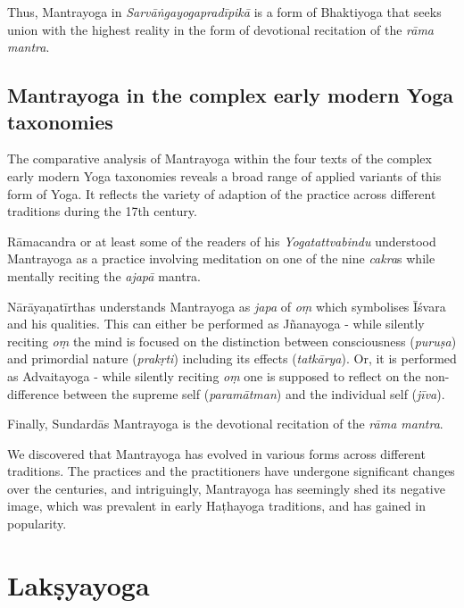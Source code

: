 Thus, Mantrayoga in \textit{Sarvāṅgayogapradīpikā} is a form of Bhaktiyoga that seeks union with the highest reality in the form of devotional recitation of the \textit{rāma mantra}. 

\subsection{Mantrayoga in the complex early modern Yoga taxonomies}

The comparative analysis of Mantrayoga within the four texts of the complex early modern Yoga taxonomies reveals a broad range of applied variants of this form of Yoga. It reflects the variety of adaption of the practice across different traditions during the 17th century.

Rāmacandra or at least some of the readers of his \emph{Yogatattvabindu} understood Mantrayoga as a practice involving meditation on one of the nine \textit{cakra}s while mentally reciting the \textit{ajapā} mantra.

Nārāyaṇatīrthas understands Mantrayoga as \textit{japa} of \textit{oṃ} which symbolises Īśvara and his qualities. This can either be performed as Jñanayoga - while silently reciting \textit{oṃ} the mind is focused on the distinction between consciousness (\textit{puruṣa}) and primordial nature (\textit{prakṛti}) including its effects (\textit{tatkārya}). Or, it is performed as Advaitayoga - while silently reciting \textit{oṃ} one is supposed to reflect on the non-difference between the supreme self (\textit{paramātman}) and the individual self (\textit{jīva}).

Finally, Sundardās Mantrayoga is the devotional recitation of the \textit{rāma mantra}.

We discovered that Mantrayoga has evolved in various forms across different traditions. The practices and the practitioners have undergone significant changes over the centuries, and intriguingly, Mantrayoga has seemingly shed its negative image, which was prevalent in early Haṭhayoga traditions, and has gained in popularity. 

\section{Lakṣyayoga}
\label{laksyayogaintro}

